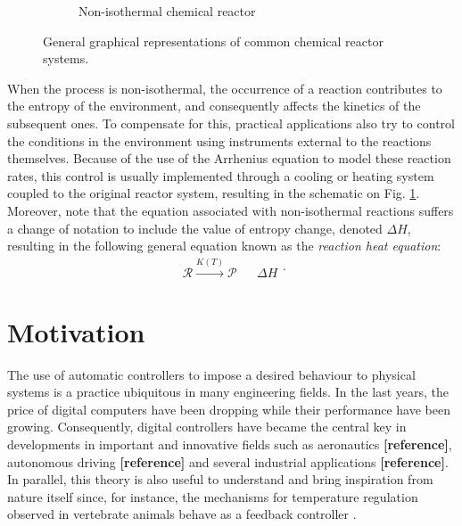 \documentclass[a4paper,11pt]{book}
\numberwithin{figure}{chapter}
\numberwithin{equation}{chapter}
\numberwithin{table}{chapter}
\theoremstyle{definition}
\begin{document}
\begin{figure}
\begin{subfigure}{0.49\textwidth}
{}
	
	\caption{Non-isothermal chemical reactor}
	\label{fig:intro03b}
	\end{subfigure}	
	
	\caption{General graphical representations of common chemical reactor systems.}
	\label{fig:intro03}
\end{figure}

When the process is non-isothermal, the occurrence of a reaction contributes to the entropy of the environment, and consequently affects the kinetics of the subsequent ones. To compensate for this, practical applications also try to control the conditions in the environment using instruments external to the reactions themselves. Because of the use of the Arrhenius equation to model these reaction rates, this control is usually implemented through a cooling or heating system coupled to the original reactor system, resulting in the schematic on Fig. \ref{fig:intro03b}. Moreover, note that the equation associated with non-isothermal reactions suffers a change of notation to include the value of entropy change, denoted $\Delta H$, resulting in the following general equation known as the \textit{reaction heat equation}:
\begin{equation}
\begin{matrix}    
	\mathcal{R} \overset{K(T)}{\longrightarrow} \mathcal{P} & & \Delta H
\end{matrix}
.\end{equation} 

\section{Motivation}

The use of automatic controllers to impose a desired behaviour to physical systems is a practice ubiquitous in many engineering fields. In the last years, the price of digital computers have been dropping while their performance have been growing. Consequently, digital controllers have became the central key in developments in important and innovative fields such as aeronautics \textbf{[reference]}, autonomous driving \textbf{[reference]} and several industrial applications \textbf{[reference]}. In parallel, this theory is also useful to understand and bring inspiration from nature itself since, for instance, the mechanisms for temperature regulation observed in vertebrate animals behave as a feedback controller \cite{Heller:1978}.
\end{document}
